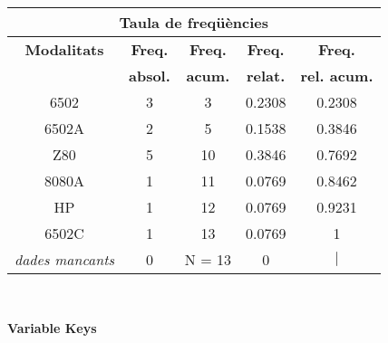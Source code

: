 \begin{center}
\begin{tabular}{|c|c|c|c|@{}c@{}|}
\hline
\multicolumn{5}{|c|}{\bf Taula de freq\" u\`encies} \\ 
\hline
{\bf Modalitats} & {\bf Freq.} & {\bf Freq.} & {\bf Freq.} & {\bf Freq.} \\ 
 & {\bf absol.} & {\bf acum.} & {\bf relat.} & {\bf rel. acum.} \\ 
\hline
\hline
6502 & 3 & 3 & 0.2308 & 0.2308 \\ 
6502A & 2 & 5 & 0.1538 & 0.3846 \\ 
Z80 & 5 & 10 & 0.3846 & 0.7692 \\ 
8080A & 1 & 11 & 0.0769 & 0.8462 \\ 
HP & 1 & 12 & 0.0769 & 0.9231 \\ 
6502C & 1 & 13 & 0.0769 & 1 \\ 
\hline
\hline
\it dades mancants & 0 & N = 13 & 0 & \colorbox{gris}{\color{gris}$|$ \hspace{11ex}} \\ 
\hline
\end{tabular}
\end{center} \vfill

\vspace{3ex}
\mbox{ } \vfill
\begin{center} \Large \bf Variable Keys \end{center}

